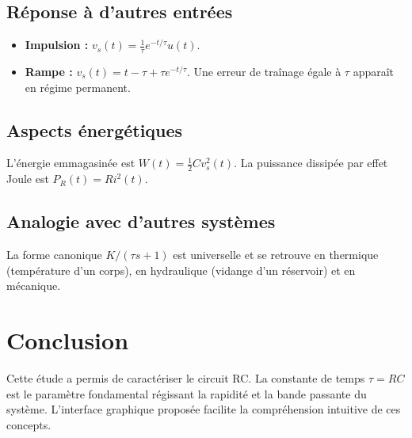 \documentclass[12pt,a4paper]{article}
\begin{document}
	\subsection{Réponse à d'autres entrées}
	\begin{itemize}
		\item \textbf{Impulsion :} $v_s(t) = \frac{1}{\tau} e^{-t/\tau} u(t)$.
		\item \textbf{Rampe :} $v_s(t) = t - \tau + \tau e^{-t/\tau}$. Une erreur de traînage égale à $\tau$ apparaît en régime permanent.
	\end{itemize}
	
	\subsection{Aspects énergétiques}
	L'énergie emmagasinée est $W(t) = \frac{1}{2} C v_s^2(t)$. La puissance dissipée par effet Joule est $P_R(t) = R i^2(t)$.
	
	\subsection{Analogie avec d'autres systèmes}
	La forme canonique $K/(\tau s + 1)$ est universelle et se retrouve en thermique (température d'un corps), en hydraulique (vidange d'un réservoir) et en mécanique.
	
	\section{Conclusion}
	Cette étude a permis de caractériser le circuit RC. La constante de temps $\tau = RC$ est le paramètre fondamental régissant la rapidité et la bande passante du système. L'interface graphique proposée facilite la compréhension intuitive de ces concepts.
	
\end{document}
